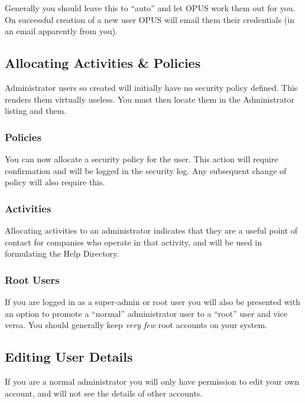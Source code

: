 \documentclass[12 pt]{book}
\begin{document}
Generally you should leave this to ``auto'' and let OPUS work them out for you.
On successful creation of a new user OPUS will email them their credentials
(in an email apparently from you).

\subsection{Allocating Activities \& Policies}

Administrator users so created will initially have no security policy defined. This
renders them virtually useless. You must then locate them in the Administrator listing
and  them. 

\subsubsection{Policies}

You can now allocate a security policy for the user. This action will require
confirmation and will be logged in the security log. Any subsequent change of policy
will also require this.

\subsubsection{Activities}

Allocating activities to an administrator indicates that they are a useful point of
contact for companies who operate in that activity, and will be used in formulating
the Help Directory.

\subsubsection{Root Users}


If you are logged in as a super-admin or root user you will also be presented with
an option to promote a ``normal'' administrator user to a ``root'' user and vice versa.
You should generally keep \emph{very few} root accounts on your system.

\subsection{Editing User Details}

If you are a normal administrator you will only have permission to edit your own
account, and will not see the details of other accounts.
\end{document}
